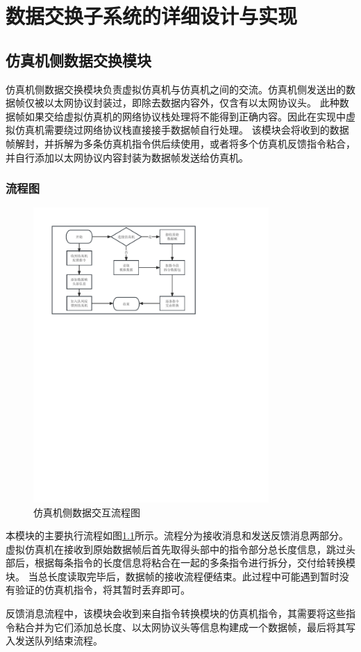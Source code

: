 \chapter{数据交换子系统的详细设计与实现}
\section{仿真机侧数据交换模块}
仿真机侧数据交换模块负责虚拟仿真机与仿真机之间的交流。仿真机侧发送出的数据帧仅被以太网协议封装过，即除去数据内容外，仅含有以太网协议头。
此种数据帧如果交给虚拟仿真机的网络协议栈处理将不能得到正确内容。因此在实现中虚拟仿真机需要绕过网络协议栈直接接手数据帧自行处理。
该模块会将收到的数据帧解封，并拆解为多条仿真机指令供后续使用，或者将多个仿真机反馈指令粘合，并自行添加以太网协议内容封装为数据帧发送给仿真机。
\subsection{流程图}
\begin{figure}[h!]
    \begin{center}
        \includegraphics[width=0.8\textwidth]{pictures/flowchart1.pdf}
        \caption{仿真机侧数据交互流程图}
        \label{module11}
    \end{center}
\end{figure}
\vspace{7pt}
\par
本模块的主要执行流程如图\ref{module11}所示。流程分为接收消息和发送反馈消息两部分。虚拟仿真机在接收到原始数据帧后首先取得头部中的指令部分总长度信息，跳过头部后，根据每条指令的长度信息将粘合在一起的多条指令进行拆分，交付给转换模块。
当总长度读取完毕后，数据帧的接收流程便结束。此过程中可能遇到暂时没有验证的仿真机指令，将其暂时丢弃即可。
\par
反馈消息流程中，该模块会收到来自指令转换模块的仿真机指令，其需要将这些指令粘合并为它们添加总长度、以太网协议头等信息构建成一个数据帧，最后将其写入发送队列结束流程。

